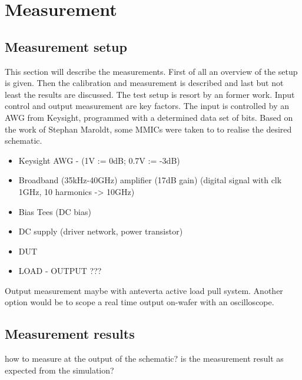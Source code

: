 \chapter{Measurement}
\section{Measurement setup}
This section will describe the measurements. First of all an overview of the setup is given. Then the calibration and measurement is described and last but not least the results are discussed. The test setup is resort by an former work.
Input control and output measurement are key factors. The input is controlled by an AWG from Keysight, programmed with a determined data set of bits. Based on the work of Stephan Maroldt, some MMICs were taken to to realise the desired schematic. 
\begin{itemize}
	\item Keysight AWG - (1V := 0dB; 0.7V := -3dB)
	\item Broadband (35kHz-40GHz) amplifier (17dB gain) (digital signal with clk 1GHz, 10 harmonics -> 10GHz)
	\item Bias Tees (DC bias)
	\item DC supply (driver network, power transistor)
	\item DUT
	\item LOAD - OUTPUT ???
\end{itemize}
Output measurement maybe with anteverta active load pull system. Another option would be to scope a real time output on-wafer with an oscilloscope.
\section{Measurement results}
how to measure at the output of the schematic? is the measurement result as expected from the simulation?